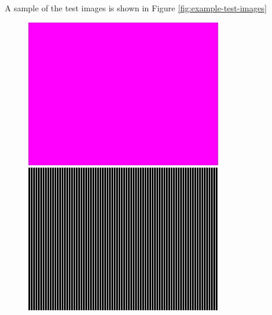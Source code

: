 \begin{appendices}
A sample of the test images is shown in Figure \ref{fig:example-test-images}

\begin{figure}[ht]
	\begin{minipage}[]{0.5\linewidth}
		\centering
		\includegraphics[width = 0.6\linewidth]{figs/test_imgs/color_5}
	\end{minipage}
	\begin{minipage}[]{0.5\linewidth}
		\centering
		\includegraphics[width = 0.6\linewidth]{figs/test_imgs/freq_1}
	\end{minipage}
	

\end{figure}
\end{appendices}
